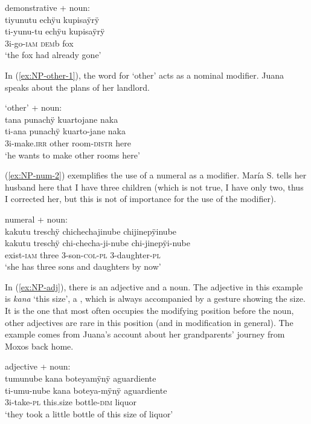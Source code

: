 {\ea\label{ex:NP-dem}
\begingl
\glpreamble \textup{demonstrative + noun:}\\tiyunutu echÿu kupisaÿrÿ\\
\gla ti-yunu-tu echÿu kupisaÿrÿ\\
\glb 3i-go-\textsc{iam} \textsc{dem}b fox\\
\glft ‘the fox had already gone’
\endgl
\trailingcitation{[jmx-n120429ls-x5.170]}
\xe

In (\ref{ex:NP-other-1}), the word for ‘other’ acts as a nominal modifier. Juana speaks about the plans of her landlord.

\ea\label{ex:NP-other-1}
\begingl
\glpreamble \textup{‘other’ + noun:}\\tana punachÿ kuartojane naka\\
\gla ti-ana punachÿ kuarto-jane naka\\
\glb 3i-make.\textsc{irr} other room-\textsc{distr} here\\
\glft ‘he wants to make other rooms here’
\endgl
\trailingcitation{[jxx-p120430l-1.393]}
\xe

(\ref{ex:NP-num-2}) exemplifies the use of a numeral as a modifier. María S. tells her husband here that I have three children (which is not true, I have only two, thus I corrected her, but this is not of importance for the use of the modifier). 

\ea\label{ex:NP-num-2}
\begingl
\glpreamble \textup{numeral + noun:}\\kakutu treschÿ chichechajinube chijinepÿinube\\
\gla kakutu treschÿ chi-checha-ji-nube chi-jinepÿi-nube\\
\glb exist-\textsc{iam} three 3-son-\textsc{col}-\textsc{pl} 3-daughter-\textsc{pl}\\
\glft ‘she has three sons and daughters by now’
\endgl
\trailingcitation{[rmx-e150922l.076]}
\xe


In (\ref{ex:NP-adj}), there is an adjective  and a noun. The adjective in this example is \textit{kana} ‘this size’, a , which is always accompanied by a gesture showing the size. It is the one that most often occupies the modifying position before the noun, other adjectives are rare in this position (and in modification in general). The example comes from Juana’s account about her grandparents’ journey from Moxos back home.

\ea\label{ex:NP-adj}
\begingl
\glpreamble \textup{adjective + noun:}\\tumunube kana boteyamÿnÿ aguardiente\\
\gla ti-umu-nube kana boteya-mÿnÿ aguardiente\\
\glb 3i-take-\textsc{pl} this.size bottle-\textsc{dim} liquor\\
\glft ‘they took a little bottle of this size of liquor'
\endgl
\trailingcitation{[jxx-p151016l-2.235]}
\xe{}

}
